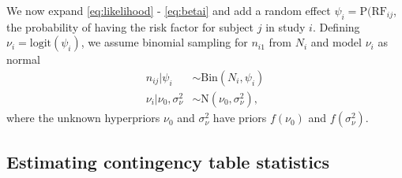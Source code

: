 \documentclass[AMA,STIX1COL]{WileyNJD-v2}
\newcommand{\RF}{\mbox{RF}}
\begin{document}
We now expand \eqref{eq:likelihood} - \eqref{eq:betai} and add a random effect $\psi_i = \mbox{P}(\RF_{ij}$, the probability of having the risk factor for subject $j$ in study $i$. Defining $\nu_i = \mbox{logit}(\psi_i)$, we assume binomial sampling for $n_{i1}$ from $N_i$ and model $\nu_i$ as normal
\begin{align}
n_{ij} \vert \psi_i &\sim \mbox{Bin}(N_i, \psi_i) \label{eq:nij} \\
\nu_i \vert \nu_0, \sigma^2_\nu & \sim \mbox{N}(\nu_0, \sigma^2_\nu), \label{eq:nui}
\end{align}
\noindent where the unknown hyperpriors $\nu_0$ and $\sigma^2_\nu$ have priors $f(\nu_0)$ and $f(\sigma^2_{\nu})$. 

\subsection{Estimating contingency table statistics} \label{sec:CTSs}
\end{document}
